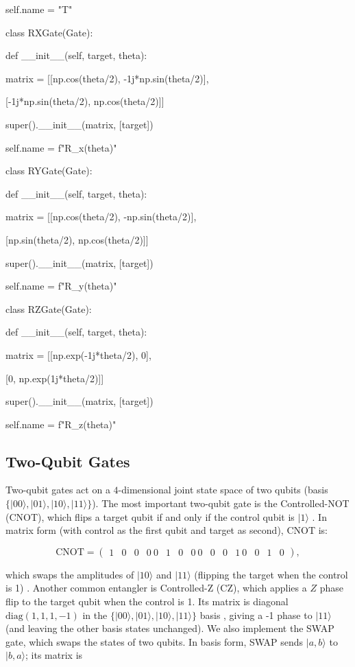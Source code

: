 \documentclass[%
oneside,                 %
final,                   %
10pt]{article}
\begin{document}
        self.name = "T"



class RXGate(Gate):

    def __init__(self, target, theta):

        matrix = [[np.cos(theta/2), -1j*np.sin(theta/2)],

                  [-1j*np.sin(theta/2), np.cos(theta/2)]]

        super().__init__(matrix, [target])

        self.name = f"R_x({theta})"



class RYGate(Gate):

    def __init__(self, target, theta):

        matrix = [[np.cos(theta/2), -np.sin(theta/2)],

                  [np.sin(theta/2),  np.cos(theta/2)]]

        super().__init__(matrix, [target])

        self.name = f"R_y({theta})"



class RZGate(Gate):

    def __init__(self, target, theta):

        matrix = [[np.exp(-1j*theta/2), 0],

                  [0, np.exp(1j*theta/2)]]

        super().__init__(matrix, [target])

        self.name = f"R_z({theta})"

\epycod


\subsection{Two-Qubit Gates}

Two-qubit gates act on a $4$-dimensional joint state space of two
qubits (basis $\{\vert 00\rangle,\vert 01\rangle,\vert 10\rangle,\vert 11\rangle\}$). The
most important two-qubit gate is the Controlled-NOT (CNOT), which
flips a target qubit if and only if the control qubit is $|1\rangle$
. In matrix form (with control as the first qubit and target as
second), CNOT is:

\[ \text{CNOT} = \begin{pmatrix}
1 & 0 & 0 & 0\
0 & 1 & 0 & 0\
0 & 0 & 0 & 1\
0 & 0 & 1 & 0
\end{pmatrix},
\]

which swaps the amplitudes of $|10\rangle$ and $|11\rangle$ (flipping
the target when the control is 1) . Another common entangler is
Controlled-Z (CZ), which applies a $Z$ phase flip to the target qubit
when the control is 1. Its matrix is diagonal
$\mathrm{diag}(1,1,1,-1)$ in the
$\{\vert 00\rangle,\vert 01\rangle,\vert 10\rangle,\vert 11\rangle\}$ basis , giving a -1
phase to $|11\rangle$ (and leaving the other basis states
unchanged). We also implement the SWAP gate, which swaps the states of
two qubits. In basis form, SWAP sends $|a,b\rangle$ to $|b,a\rangle$;
its matrix is
\end{document}
